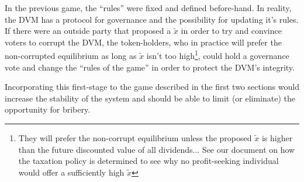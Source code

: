 \documentclass[12pt]{article}
\begin{document}
  In the previous game, the ``rules'' were fixed and defined before-hand. In reality, the DVM
  has a protocol for governance and the possibility for updating it's rules. If there were an
  outside party that proposed a $\tilde{x}$ in order to try and convince voters to corrupt the
  DVM, the token-holders, who in practice will prefer the non-corrupted equilibrium as long as
  $\tilde{x}$ isn't too high\footnote{They will prefer the non-corrupt equilibrium unless the
  proposed $\tilde{x}$ is higher than the future discounted value of all dividends... See our
  document on how the taxation policy is determined to see why no profit-seeking individual
  would offer a sufficiently high $\tilde{x}$}, could hold a governance vote and change the
  ``rules of the game'' in order to protect the DVM's integrity.

  Incorporating this first-stage to the game described in the first two sections would increase
  the stability of the system and should be able to limit (or eliminate) the opportunity for
  bribery.
\end{document}

